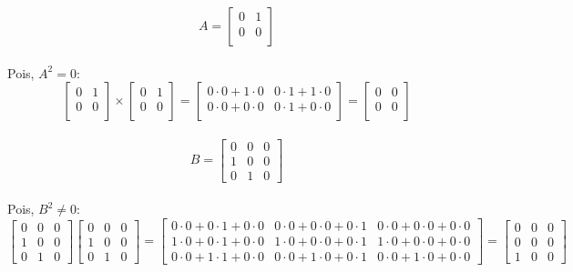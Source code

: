 \documentclass[leqno]{article}
\begin{document}
\begin{enumerate}
		\begin{sol} 
			$$ A = \begin{bmatrix} 
				0 & 1  \\
				0 & 0  \\
			\end{bmatrix} $$\\
		Pois, $A^2 = 0$:\\
		$$ \begin{bmatrix} 
			0 & 1  \\
			0 & 0  \\
		\end{bmatrix} ×
			\begin{bmatrix} 
			0 & 1  \\
			0 & 0  \\
		\end{bmatrix} = 
		\begin{bmatrix} 
			0 \cdot 0 + 1 \cdot 0 & 0 \cdot 1 + 1 \cdot 0 \\
			0 \cdot 0 + 0 \cdot 0 & 0 \cdot 1 + 0 \cdot 0 \\
		\end{bmatrix} =
		\begin{bmatrix} 
			0 & 0  \\
			0 & 0  \\
		\end{bmatrix}$$ \\
		$$ B = \begin{bmatrix}
			0 & 0 & 0\\
			1 & 0 & 0\\
			0 & 1 & 0
		\end{bmatrix}$$\\
		Pois, $B^2 \neq 0$:\\
		$$\begin{bmatrix}
			0 & 0 & 0\\
			1 & 0 & 0\\
			0 & 1 & 0
		\end{bmatrix}
		\begin{bmatrix}
			0 & 0 & 0\\
			1 & 0 & 0\\
			0 & 1 & 0
		\end{bmatrix} =
		\begin{bmatrix}
			0 \cdot 0 + 0 \cdot 1 + 0 \cdot 0 & 0 \cdot 0 + 0 \cdot 0 + 0 \cdot 1 & 0 \cdot 0 + 0 \cdot 0 + 0 \cdot 0\\
			1 \cdot 0 + 0 \cdot 1 + 0 \cdot 0 & 1 \cdot 0 + 0 \cdot 0 + 0 \cdot 1 & 1 \cdot 0 + 0 \cdot 0 + 0 \cdot 0\\
			0 \cdot 0 + 1 \cdot 1 + 0 \cdot 0 & 0 \cdot 0 + 1 \cdot 0 + 0 \cdot 1 & 0 \cdot 0 + 1 \cdot 0 + 0 \cdot 0
		\end{bmatrix} =
		\begin{bmatrix}
			0 & 0 & 0\\
			0 & 0 & 0\\
			1 & 0 & 0
		\end{bmatrix}$$\\
		

\end{sol}
\end{enumerate}
\end{document}
